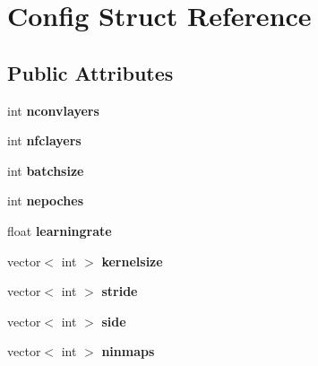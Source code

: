 \hypertarget{struct_config}{\section{Config Struct Reference}
\label{struct_config}
}
\subsection*{Public Attributes}
\begin{DoxyCompactItemize}
\item 
\hypertarget{struct_config_a5faf413f16ae3ad303c276dec55bbb43}{int {\bfseries nconvlayers}}\label{struct_config_a5faf413f16ae3ad303c276dec55bbb43}

\item 
\hypertarget{struct_config_af47a71c333fe0f02e92b13da02c1ffa8}{int {\bfseries nfclayers}}\label{struct_config_af47a71c333fe0f02e92b13da02c1ffa8}

\item 
\hypertarget{struct_config_a85e7b70b6903aefe622b53492da3d032}{int {\bfseries batchsize}}\label{struct_config_a85e7b70b6903aefe622b53492da3d032}

\item 
\hypertarget{struct_config_aed63e107038eab8d601de27e993de899}{int {\bfseries nepoches}}\label{struct_config_aed63e107038eab8d601de27e993de899}

\item 
\hypertarget{struct_config_a83ecc26b02c50f6681925778f269e6ed}{float {\bfseries learningrate}}\label{struct_config_a83ecc26b02c50f6681925778f269e6ed}

\item 
\hypertarget{struct_config_a0b6003bfcc65f1a55a9cf29156caf37d}{vector$<$ int $>$ {\bfseries kernelsize}}\label{struct_config_a0b6003bfcc65f1a55a9cf29156caf37d}

\item 
\hypertarget{struct_config_a71f761af3cb2a94a3d039ca5ca56b457}{vector$<$ int $>$ {\bfseries stride}}\label{struct_config_a71f761af3cb2a94a3d039ca5ca56b457}

\item 
\hypertarget{struct_config_a693cac50b07661bcc70ae0cf0e8867cb}{vector$<$ int $>$ {\bfseries side}}\label{struct_config_a693cac50b07661bcc70ae0cf0e8867cb}

\item 
\hypertarget{struct_config_a617b8fe3924d8cfdeea2701b48fa4626}{vector$<$ int $>$ {\bfseries ninmaps}}\label{struct_config_a617b8fe3924d8cfdeea2701b48fa4626}


\end{DoxyCompactItemize}
